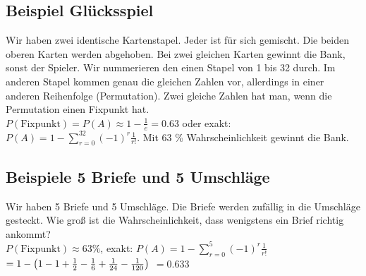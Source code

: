 \subsection{Beispiel Glücksspiel}
Wir haben zwei identische Kartenstapel. Jeder ist für sich gemischt. Die beiden oberen Karten werden abgehoben. Bei zwei gleichen Karten gewinnt die Bank, sonst der Spieler. Wir nummerieren den einen Stapel von 1 bis 32 durch. Im anderen Stapel kommen genau die gleichen Zahlen vor, allerdings in einer anderen Reihenfolge (Permutation). Zwei gleiche Zahlen hat man, wenn die Permutation einen Fixpunkt hat. \\

$P(\textrm{Fixpunkt}) = P(A) \approx 1-\frac{1}{e} = 0.63$ oder exakt:  
$P(A) = 1 - \sum_{r=0}^{32} (-1)^{r} \frac{1}{r!}$. Mit 63 \% Wahrscheinlichkeit gewinnt die Bank. 

\subsection{Beispiele 5 Briefe und 5 Umschläge}
Wir haben 5 Briefe und 5 Umschläge. Die Briefe werden zufällig in die Umschläge gesteckt. Wie groß ist die Wahrscheinlichkeit, dass wenigstens ein Brief richtig ankommt?\\

$P(\textrm{Fixpunkt}) \approx 63 \%$, exakt: 
$P(A) = 1 - \sum_{r=0}^{5} (-1)^{r} \frac{1}{r!}$
$= 1 -  \left( 1 - 1 + \frac{1}{2} - \frac{1}{6} + \frac{1}{24} - \frac{1}{120} \right) $
$=0.633$

